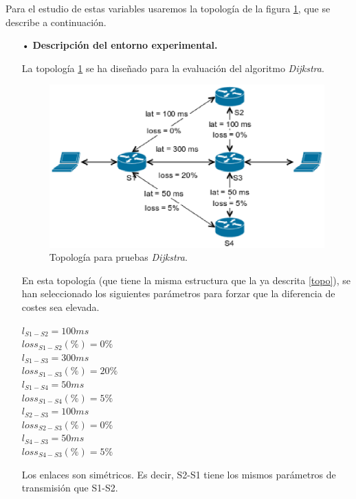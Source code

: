 \documentclass[a4paper,11pt]{book}
\begin{document}
Para el estudio de estas variables usaremos la topología de la figura \ref{topoCaminos}, que se describe a continuación.

\begin{itemize}
\item[•] \textbf{Descripción del entorno experimental.}

La topología \ref{topoCaminos} se ha diseñado para la evaluación del algoritmo \textit{Dijkstra}.

\begin{figure}[tb]
\centering
\includegraphics[scale=0.7]{./figuras/topoCaminos}
\caption{Topología para pruebas \textit{Dijkstra}.}
\label{topoCaminos}
\end{figure}

En esta topología (que tiene la misma estructura que la ya descrita \ref{topo}), se han seleccionado los siguientes parámetros para forzar que la diferencia de costes sea elevada.

\begin{center}
$l_{S1-S2} = 100 ms$\\
$loss_{S1-S2}(\%) = 0 \%$\\
$l_{S1-S3} = 300 ms$\\
$loss_{S1-S3}(\%) = 20 \%$\\
$l_{S1-S4} = 50 ms$\\
$loss_{S1-S4}(\%) = 5 \%$\\
$l_{S2-S3} =  100ms$\\
$loss_{S2-S3}(\%) = 0 \%$\\
$l_{S4-S3} = 50 ms$\\
$loss_{S4-S3}(\%) = 5 \%$
\end{center}

Los enlaces son simétricos. Es decir, S2-S1 tiene los mismos parámetros de transmisión que S1-S2.


\end{itemize}
\end{document}
